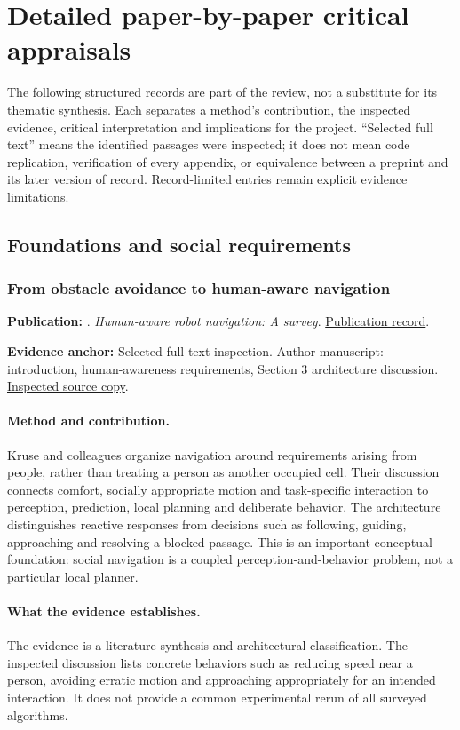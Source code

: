 \section{Detailed paper-by-paper critical appraisals}
\label{app:appraisals}
The following structured records are part of the review, not a substitute for its
thematic synthesis. Each separates a method's contribution, the inspected evidence,
critical interpretation and implications for the project. ``Selected full text''
means the identified passages were inspected; it does not mean code replication,
verification of every appendix, or equivalence between a preprint and its later
version of record. Record-limited entries remain explicit evidence limitations.

\subsection{Foundations and social requirements}
\subsubsection{From obstacle avoidance to human-aware navigation}\label{paper:survey2013}
\textbf{Publication:} \citet{survey2013}. \emph{Human-aware robot navigation: A survey}. \href{https://doi.org/10.1016/j.robot.2013.05.007}{Publication record}.

\textbf{Evidence anchor:} Selected full-text inspection. Author manuscript: introduction, human-awareness requirements, Section 3 architecture discussion. \href{https://hal.science/hal-01684295v1/document}{Inspected source copy}.

\paragraph{Method and contribution.} Kruse and colleagues organize navigation around requirements arising from people, rather than treating a person as another occupied cell. Their discussion connects comfort, socially appropriate motion and task-specific interaction to perception, prediction, local planning and deliberate behavior. The architecture distinguishes reactive responses from decisions such as following, guiding, approaching and resolving a blocked passage. This is an important conceptual foundation: social navigation is a coupled perception-and-behavior problem, not a particular local planner.

\paragraph{What the evidence establishes.} The evidence is a literature synthesis and architectural classification. The inspected discussion lists concrete behaviors such as reducing speed near a person, avoiding erratic motion and approaching appropriately for an intended interaction. It does not provide a common experimental rerun of all surveyed algorithms.

